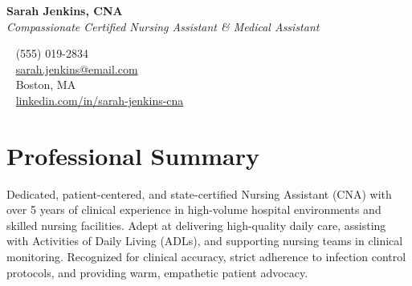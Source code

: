 \documentclass[10pt,letterpaper]{article}
\begin{document}
\pagestyle{empty}

\begin{tcolorbox}[
    colback=accent,
    top=14pt,
    bottom=14pt,
    left=15pt,
    right=15pt,
    grow to left by=1.0cm,
    grow to right by=1.0cm,
]
  \begin{minipage}[t]{0.62\linewidth}
    {\color{white}\Huge\bfseries Sarah Jenkins, CNA} \\[2mm]
    {\color{white}\large\itshape Compassionate Certified Nursing Assistant \& Medical Assistant}
  \end{minipage}
  \hfill
  \begin{minipage}[t]{0.34\linewidth}
    \raggedleft
    \color{white}\small
    \faPhone* ~ (555) 019-2834 \\
    \faEnvelope ~ \href{mailto:sarah.jenkins@email.com}{\color{white}sarah.jenkins@email.com} \\
    \faMapMarker* ~ Boston, MA \\
    \faLinkedin ~ \href{https://linkedin.com/in/sarah-jenkins-cna}{\color{white}linkedin.com/in/sarah-jenkins-cna}
  \end{minipage}
\end{tcolorbox}

\vspace{4mm}

\section{Professional Summary}
Dedicated, patient-centered, and state-certified Nursing Assistant (CNA) with over 5 years of clinical experience in high-volume hospital environments and skilled nursing facilities. Adept at delivering high-quality daily care, assisting with Activities of Daily Living (ADLs), and supporting nursing teams in clinical monitoring. Recognized for clinical accuracy, strict adherence to infection control protocols, and providing warm, empathetic patient advocacy.

\vspace{4mm}
\end{document}
